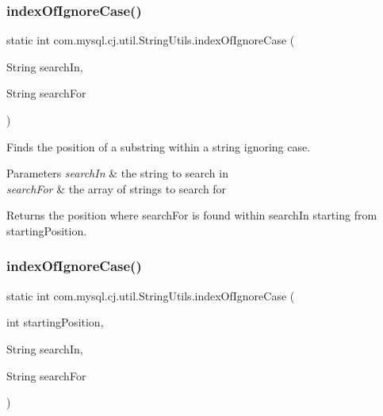 \subsubsection{\texorpdfstring{index\+Of\+Ignore\+Case()}{indexOfIgnoreCase()}\hspace{0.1cm}{\footnotesize\ttfamily [1/5]}}
{\footnotesize\ttfamily static int com.\+mysql.\+cj.\+util.\+String\+Utils.\+index\+Of\+Ignore\+Case (\begin{DoxyParamCaption}\item[{String}]{search\+In,  }\item[{String}]{search\+For }\end{DoxyParamCaption})\hspace{0.3cm}{\ttfamily [static]}}

Finds the position of a substring within a string ignoring case.


\begin{DoxyParams}{Parameters}
{\em search\+In} & the string to search in \\
\hline
{\em search\+For} & the array of strings to search for \\
\hline
\end{DoxyParams}
\begin{DoxyReturn}{Returns}
the position where {\ttfamily search\+For} is found within {\ttfamily search\+In} starting from {\ttfamily starting\+Position}. 
\end{DoxyReturn}
\mbox{\label{classcom_1_1mysql_1_1cj_1_1util_1_1_string_utils_a716494cab67842271dd23a566f2c493a}} 
\subsubsection{\texorpdfstring{index\+Of\+Ignore\+Case()}{indexOfIgnoreCase()}\hspace{0.1cm}{\footnotesize\ttfamily [2/5]}}
{\footnotesize\ttfamily static int com.\+mysql.\+cj.\+util.\+String\+Utils.\+index\+Of\+Ignore\+Case (\begin{DoxyParamCaption}\item[{int}]{starting\+Position,  }\item[{String}]{search\+In,  }\item[{String}]{search\+For }\end{DoxyParamCaption})\hspace{0.3cm}{\ttfamily [static]}}

